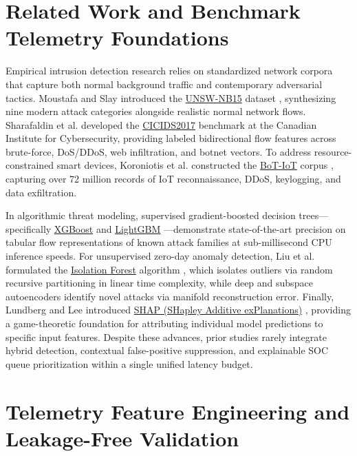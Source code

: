 \documentclass[10pt,a4paper]{article}
\begin{document}
\section{Related Work and Benchmark Telemetry Foundations}
Empirical intrusion detection research relies on standardized network corpora that capture both normal background traffic and contemporary adversarial tactics. Moustafa and Slay introduced the \href{https://research.unsw.edu.au/projects/unsw-nb15-dataset}{UNSW-NB15} dataset \cite{unswnb15}, synthesizing nine modern attack categories alongside realistic normal network flows. Sharafaldin et al. developed the \href{https://www.unb.ca/cic/datasets/ids-2017.html}{CICIDS2017} benchmark \cite{cicids2017} at the Canadian Institute for Cybersecurity, providing labeled bidirectional flow features across brute-force, DoS/DDoS, web infiltration, and botnet vectors. To address resource-constrained smart devices, Koroniotis et al. constructed the \href{https://research.unsw.edu.au/projects/bot-iot-dataset}{BoT-IoT} corpus \cite{botiot}, capturing over 72 million records of IoT reconnaissance, DDoS, keylogging, and data exfiltration.

In algorithmic threat modeling, supervised gradient-boosted decision trees---specifically \href{https://xgboost.readthedocs.io/}{XGBoost} \cite{xgboost} and \href{https://lightgbm.readthedocs.io/}{LightGBM} \cite{lightgbm}---demonstrate state-of-the-art precision on tabular flow representations of known attack families at sub-millisecond CPU inference speeds. For unsupervised zero-day anomaly detection, Liu et al. formulated the \href{https://ieeexplore.ieee.org/document/4781136}{Isolation Forest} algorithm \cite{iforest}, which isolates outliers via random recursive partitioning in linear time complexity, while deep and subspace autoencoders identify novel attacks via manifold reconstruction error. Finally, Lundberg and Lee introduced \href{https://github.com/shap/shap}{SHAP (SHapley Additive exPlanations)} \cite{shap}, providing a game-theoretic foundation for attributing individual model predictions to specific input features. Despite these advances, prior studies rarely integrate hybrid detection, contextual false-positive suppression, and explainable SOC queue prioritization within a single unified latency budget.

\section{Telemetry Feature Engineering and Leakage-Free Validation}
\end{document}
